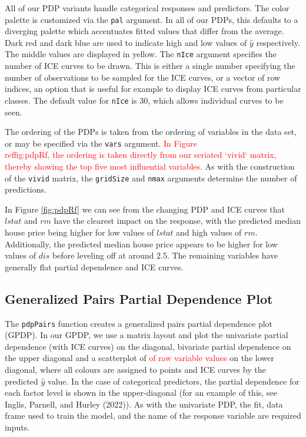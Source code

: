All of our PDP variants handle categorical responses and predictors. The color palette is customized via the \texttt{pal} argument. In all of our PDPs, this defaults to a diverging palette which accentuates fitted values that differ from the average. Dark red and dark blue are used to indicate high and low values of \(\hat{y}\) respectively. The middle values are displayed in yellow. The \texttt{nIce} argument specifies the number of ICE curves to be drawn. This is either a single number specifying the number of observations to be sampled for the ICE curves, or a vector of row indices, an option that is useful for example to display ICE curves from particular classes. The default value for \texttt{nIce} is 30, which allows individual curves to be seen.

The ordering of the PDPs is taken from the ordering of variables in the data set, or may be specified via the \texttt{vars} argument. \textcolor{red}{In Figure \\ref{fig:pdpRf}, the ordering is taken directly from our seriated `vivid` matrix, thereby showing the top five most influential variables.} As with the construction of the \texttt{vivid} matrix, the \texttt{gridSize} and \texttt{nmax} arguments determine the number of predictions.

In Figure \ref{fig:pdpRf} we can see from the changing PDP and ICE curves that \(lstat\) and \(rm\) have the clearest impact on the response, with the predicted median house price being higher for low values of \(lstat\) and high values of \(rm\). Additionally, the predicted median house price appears to be higher for low values of \(dis\) before leveling off at around 2.5. The remaining variables have generally flat partial dependence and ICE curves.

\hypertarget{generalized-pairs-partial-dependence-plot}{%
\subsection{Generalized Pairs Partial Dependence Plot}\label{generalized-pairs-partial-dependence-plot}}

The \texttt{pdpPairs} function creates a generalized pairs partial dependence plot (GPDP). In our GPDP, we use a matrix layout and plot the univariate partial dependence (with ICE curves) on the diagonal, bivariate partial dependence on the upper diagonal and a scatterplot of \textcolor{red}{of raw variable values} on the lower diagonal, where all colours are assigned to points and ICE curves by the predicted \(\hat{y}\) value. In the case of categorical predictors, the partial dependence for each factor level is shown in the upper-diagonal (for an example of this, see Inglis, Parnell, and Hurley (2022)). As with the univariate PDP, the fit, data frame used to train the model, and the name of the response variable are required inputs.


